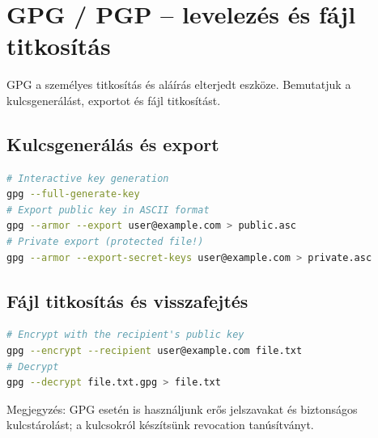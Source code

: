 \section{GPG / PGP – levelezés és fájl titkosítás}

GPG a személyes titkosítás és aláírás elterjedt eszköze. Bemutatjuk a kulcsgenerálást, exportot és fájl titkosítást.

\subsection{Kulcsgenerálás és export}
\begin{lstlisting}[language=bash]
# Interactive key generation
gpg --full-generate-key
# Export public key in ASCII format
gpg --armor --export user@example.com > public.asc
# Private export (protected file!)
gpg --armor --export-secret-keys user@example.com > private.asc
\end{lstlisting}

\subsection{Fájl titkosítás és visszafejtés}
\begin{lstlisting}[language=bash]
# Encrypt with the recipient's public key
gpg --encrypt --recipient user@example.com file.txt
# Decrypt
gpg --decrypt file.txt.gpg > file.txt
\end{lstlisting}

Megjegyzés: GPG esetén is használjunk erős jelszavakat és biztonságos kulcstárolást; a kulcsokról készítsünk revocation tanúsítványt.
